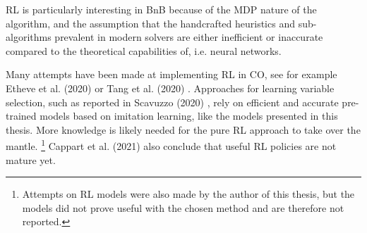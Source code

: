 \gls{RL} is particularly interesting in \gls{BnB} because of the \gls{MDP} nature of the algorithm, and the assumption that the handcrafted heuristics and sub-algorithms prevalent in modern solvers are either inefficient or inaccurate compared to the theoretical capabilities of, i.e. neural networks. 

Many attempts have been made at implementing \gls{RL} in \gls{CO}, see for example Etheve et al. (2020) \cite{etheve2020reinforcement} or Tang et al. (2020) \cite{tang2020reinforcement}. Approaches for learning variable selection, such as reported in Scavuzzo (2020) \cite{scavuzzo2020learning}, rely on efficient and accurate pre-trained models based on imitation learning, like the models presented in this thesis. More knowledge is likely needed for the pure \gls{RL} approach to take over the mantle.
\footnote{Attempts on \gls{RL} models were also made by the author of this thesis, but the models did not prove useful with the chosen method and are therefore not reported.}
Cappart et al. (2021) \cite{cappart2021combinatorial} also conclude that useful \gls{RL} policies are not mature yet. 

